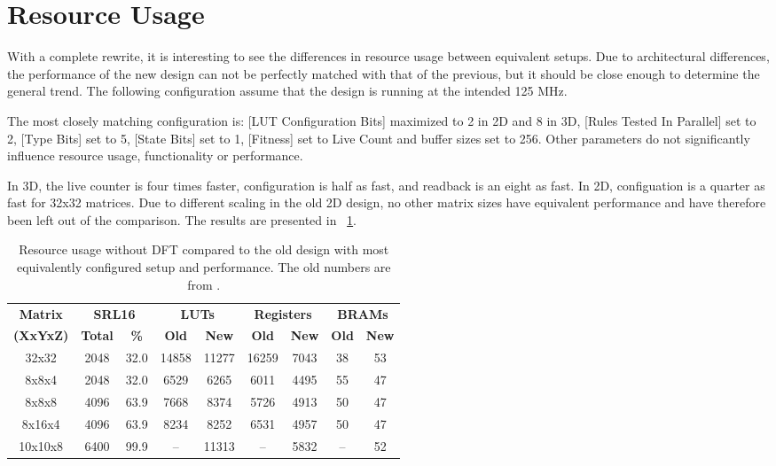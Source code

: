 \section{Resource Usage}

With a complete rewrite, it is interesting to see the differences in resource usage between equivalent setups.
Due to architectural differences, the performance of the new design can not be perfectly matched with that of the previous, but it should be close enough to determine the general trend.
The following configuration assume that the design is running at the intended 125 MHz.

The most closely matching configuration is:
[LUT Configuration Bits] maximized to 2 in 2D and 8 in 3D,
[Rules Tested In Parallel] set to 2,
[Type Bits] set to 5,
[State Bits] set to 1,
[Fitness] set to Live Count
and buffer sizes set to 256.
Other parameters do not significantly influence resource usage, functionality or performance.

In 3D, the live counter is four times faster, configuration is half as fast, and readback is an eight as fast.
In 2D, configuation is a quarter as fast for 32x32 matrices.
Due to different scaling in the old 2D design, no other matrix sizes have equivalent performance and have therefore been left out of the comparison.
The results are presented in \tablename~\ref{tab:resource-usage}.

\begin{table}[!ht]
    \renewcommand{\arraystretch}{1.4}
    \centering
    \begin{tabular}{c|c|c|c|c|c|c|c|c}
        \bfseries Matrix & \multicolumn{2}{c|}{\bfseries SRL16} & \multicolumn{2}{c|}{\bfseries LUTs} & \multicolumn{2}{c|}{\bfseries Registers} & \multicolumn{2}{c}{\bfseries BRAMs} \\
        \bfseries (XxYxZ) & \bfseries Total & \bfseries \% & \bfseries Old & \bfseries New & \bfseries Old & \bfseries New & \bfseries Old & \bfseries New \\
        \hline
        32x32 & 2048 & 32.0 & 14858 & 11277 & 16259 & 7043 & 38 & 53 \\
        8x8x4 & 2048 & 32.0 & 6529 & 6265 & 6011 & 4495 & 55 & 47 \\
        8x8x8 & 4096 & 63.9 & 7668 & 8374 & 5726 & 4913 & 50 & 47 \\
        8x16x4 & 4096 & 63.9 & 8234 & 8252 & 6531 & 4957 & 50 & 47 \\
        10x10x8 & 6400 & 99.9 & – & 11313 & – & 5832 & – & 52 \\
    \end{tabular}
    \caption[Resource usage]{
        Resource usage without DFT compared to the old design with most equivalently configured setup and performance.
        The old numbers are from \cite{stovneng2014sblock}.
    }
    \label{tab:resource-usage}
\end{table}

